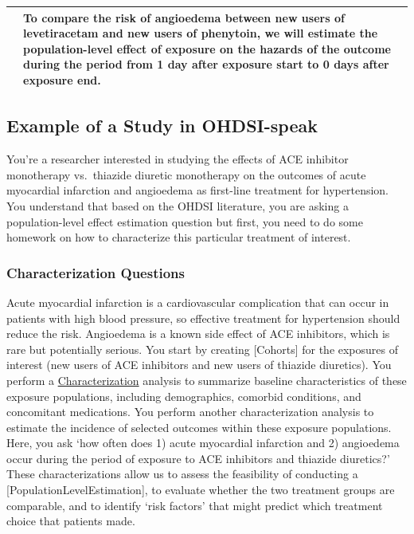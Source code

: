 \documentclass[11pt]{book}
\theoremstyle{definition}
\theoremstyle{definition}
\theoremstyle{definition}
\theoremstyle{remark}
\begin{document}
\begin{longtable}[]{@{}lll@{}}
\begin{minipage}[t]{0.30\columnwidth}
\end{minipage} & \begin{minipage}[t]{0.30\columnwidth}\raggedright
To compare the risk of \textbf{angioedema} between new users of \textbf{levetiracetam} and new users of \textbf{phenytoin}, we will estimate the population-level effect of exposure on the \textbf{hazards} of the outcome during the period from \textbf{1 day after exposure start} to \textbf{0 days after exposure end}.\strut
\end{minipage}\tabularnewline
\bottomrule
\end{longtable}

\hypertarget{example-of-a-study-in-ohdsi-speak}{%
\subsection{Example of a Study in OHDSI-speak}\label{example-of-a-study-in-ohdsi-speak}}

You're a researcher interested in studying the effects of ACE inhibitor monotherapy vs.~thiazide diuretic monotherapy on the outcomes of acute myocardial infarction and angioedema as first-line treatment for hypertension. You understand that based on the OHDSI literature, you are asking a population-level effect estimation question but first, you need to do some homework on how to characterize this particular treatment of interest.

\hypertarget{characterization-questions}{%
\subsubsection{Characterization Questions}\label{characterization-questions}}

Acute myocardial infarction is a cardiovascular complication that can occur in patients with high blood pressure, so effective treatment for hypertension should reduce the risk. Angioedema is a known side effect of ACE inhibitors, which is rare but potentially serious. You start by creating {[}Cohorts{]} for the exposures of interest (new users of ACE inhibitors and new users of thiazide diuretics). You perform a \protect\hyperlink{Characterization}{Characterization} analysis to summarize baseline characteristics of these exposure populations, including demographics, comorbid conditions, and concomitant medications. You perform another characterization analysis to estimate the incidence of selected outcomes within these exposure populations. Here, you ask `how often does 1) acute myocardial infarction and 2) angioedema occur during the period of exposure to ACE inhibitors and thiazide diuretics?' These characterizations allow us to assess the feasibility of conducting a {[}PopulationLevelEstimation{]}, to evaluate whether the two treatment groups are comparable, and to identify `risk factors' that might predict which treatment choice that patients made.
\end{document}
